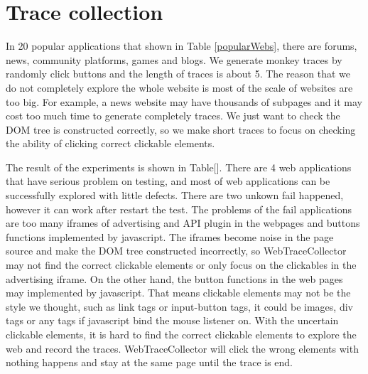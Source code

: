 \section{Trace collection}

In 20 popular applications\cite{popularWebs} that shown in Table \ref{popularWebs},
there are forums, news, community platforms, games and blogs.
We generate monkey traces by randomly click buttons and the length of traces is about 5.
The reason that we do not completely explore the whole website is most of the scale of websites are too big.
For example, a news website may have thousands of subpages and it may cost too much time to generate completely traces.
We just want to check the DOM tree is constructed correctly, 
so we make short traces to focus on checking the ability of clicking correct clickable elements.

The result of the experiments is shown in Table[].
There are 4 web applications that have serious problem on testing,
and most of web applications can be successfully explored with little defects.
There are two unkown fail happened, however it can work after restart the test.
The problems of the fail applications are 
too many iframes of advertising and API plugin in the webpages and buttons functions implemented by javascript.
The iframes become noise in the page source and make the DOM tree constructed incorrectly,
so WebTraceCollector may not find the correct clickable elements or only focus on the clickables in the advertising iframe.
On the other hand, the button functions in the web pages may implemented by javascript.
That means clickable elements may not be the style we thought, such as link tags or input-button tags,
it could be images, div tags or any tags if javascript bind the mouse listener on.
With the uncertain clickable elements, it is hard to find the correct clickable elements to explore the web and record the traces.
WebTraceCollector will click the wrong elements with nothing happens and stay at the same page until the trace is end.


